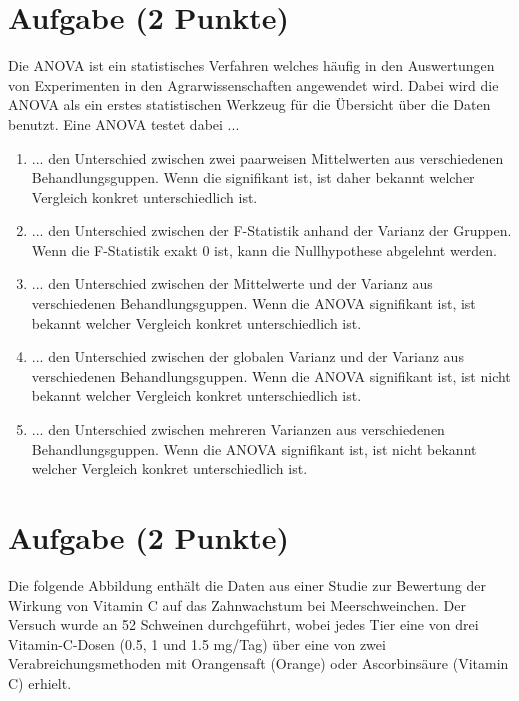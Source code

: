\documentclass[a4paper, 9pt]{scrartcl}\usepackage[]{graphicx}\usepackage[]{xcolor}
\begin{document}
\section{Aufgabe \hfill (2 Punkte)}

Die ANOVA ist ein statistisches Verfahren welches h{\"a}ufig in den
Auswertungen von Experimenten in den Agrarwissenschaften angewendet
wird. Dabei wird die ANOVA als ein erstes statistischen Werkzeug f{\"u}r die
{\"U}bersicht {\"u}ber die Daten benutzt. Eine ANOVA testet dabei ...



\begin{enumerate}
\item [\textbf{A} \msquare] ... den Unterschied zwischen zwei paarweisen Mittelwerten aus verschiedenen Behandlungsguppen. Wenn die signifikant ist, ist daher bekannt welcher Vergleich konkret unterschiedlich ist.
\item [\textbf{B} \msquare] ... den Unterschied zwischen der F-Statistik anhand der Varianz der Gruppen. Wenn die F-Statistik exakt 0 ist, kann die Nullhypothese abgelehnt werden.
\item [\textbf{C} \msquare] ... den Unterschied zwischen der Mittelwerte und der Varianz aus verschiedenen Behandlungsguppen. Wenn die ANOVA signifikant ist, ist bekannt welcher Vergleich konkret unterschiedlich ist.
\item [\textbf{D} \msquare] ... den Unterschied zwischen der globalen Varianz und der Varianz aus verschiedenen Behandlungsguppen. Wenn die ANOVA signifikant ist, ist nicht bekannt welcher Vergleich konkret unterschiedlich ist.
\item [\textbf{E} \msquare] ... den Unterschied zwischen mehreren Varianzen aus verschiedenen Behandlungsguppen. Wenn die ANOVA signifikant ist, ist nicht bekannt welcher Vergleich konkret unterschiedlich ist.
\end{enumerate} 

\section{Aufgabe \hfill (2 Punkte)}



Die folgende Abbildung enth{\"a}lt die Daten aus einer Studie zur Bewertung der
Wirkung von Vitamin C auf das Zahnwachstum bei Meerschweinchen. Der Versuch
wurde an 52 Schweinen durchgef{\"u}hrt, wobei jedes Tier eine von
drei Vitamin-C-Dosen (0.5, 1 und 1.5 mg/Tag) {\"u}ber eine von zwei
Verabreichungsmethoden mit Orangensaft (Orange) oder Ascorbins{\"a}ure (Vitamin C)
erhielt.
\end{document}
